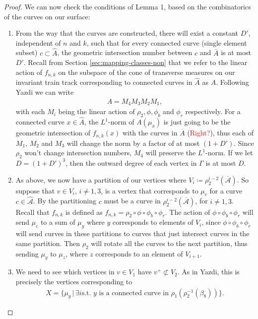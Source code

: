 \begin{proof}
We can now check the conditions of Lemma 1, based on the combinatorics of the curves on our surface:
\begin{enumerate}
    \item From the way that the curves are constructed, there will exist a constant $D'$, independent of $n$ and $k$, such that for every connected curve (single element subset) $c \subset \hat{A}$, the geometric intersection number between $c$ and $\overline{A}$ is at most $D'$.
    Recall from Section \ref{sec:mapping-classes-non} that we refer to the linear action of $f_{n,k}$ on the subspace of the cone of transverse measures on our invariant train track corresponding to connected curves in $\hat{A}$ as $A$. Following Yazdi we can write
    \begin{align*}
        A = M_4M_3M_2M_1,
    \end{align*}
    with each $M_i$ being the linear action of $\rho_2,\phi,\phi_b$ and $\phi_r$ respectively. For a connected curve $x \in \hat{A}$, the $L^1$-norm of $A(\mu_x)$ is just going to be the geometric intersection of $f_{n,k}(x)$ with the curves in $\overline{A}$ (\textcolor{red}{Right?}), thus each of $M_1$, $M_2$ and $M_3$ will change the norm by a factor of at most $(1 + D')$. Since $\rho_2$ won't change intersection numbers, $M_4$ will preserve the $L^1$-norm. If we let $D = (1 + D')^3$, then the outward degree of each vertex in $\Gamma$ is at most $D$.
    \item As above, we now have a partition of our vertices where $V_i \coloneqq \rho_2^{i-2}(\overline{\mathcal{A}})$. So suppose that $v \in V_i$, $i \neq 1,3$, is a vertex that corresponds to $\mu_c$ for a curve $c \in \hat{\mathcal{A}}$. By the partitioning $c$ must be a curve in $\rho_2^{i-2}(\overline{\mathcal{A}})$, for $i \neq 1,3$. Recall that $f_{n,k}$ is defined as $f_{n,k} = \rho_2 \circ \phi \circ \phi_b \circ \phi_r$. The action of $\phi \circ \phi_b \circ \phi_r$ will send $\mu_c$ to a sum of $\mu_y$ where $y$ corresponds to elements of $V_i$, since $\phi \circ \phi_b \circ \phi_r$ will send curves in these partitions to curves that just intersect curves in the same partition. Then $\rho_2$ will rotate all the curves to the next partition, thus sending $\mu_y$ to $\mu_z$, where $z$ corresponds to an element of $V_{i+1}$.
    \item We need to see which vertices in $v \in V_1$ have $v^+ \not\subset V_2$. As in Yazdi, this is precisely the vertices corresponding to
    \begin{align*}
        X = \{\mu_y \,\vert\, \exists i \text{s.t. $y$ is a connected curve in } \rho_1(\rho_2^{-1}(\beta_8))\}.

\end{align*}
\end{enumerate}
\end{proof}
